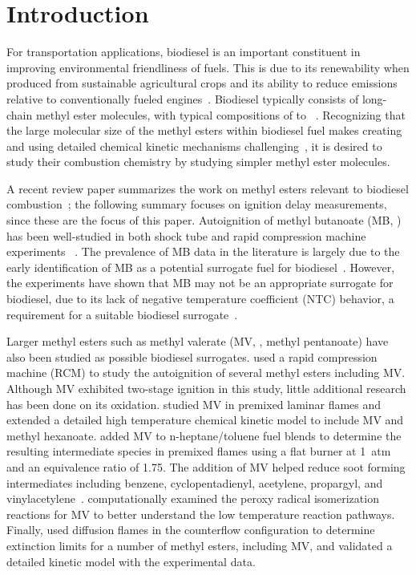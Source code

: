 \documentclass[letterpaper, review]{elsarticle}
\begin{document}
\linenumbers

\section{Introduction}\label{sec:introduction}

For transportation applications, biodiesel is an important constituent in improving environmental
friendliness of fuels. This is due to its renewability when produced from sustainable agricultural
crops and its ability to reduce emissions relative to conventionally fueled
engines~\cite{Hoekman2012}. Biodiesel typically consists of long-chain methyl ester molecules, with
typical compositions of  to ~\cite{Hoekman2012}. Recognizing that the large
molecular size of the methyl esters within biodiesel fuel makes creating and using detailed chemical
kinetic mechanisms challenging~\cite{Lai2011}, it is desired to study their combustion chemistry by
studying simpler methyl ester molecules.

A recent review paper summarizes the work on methyl esters relevant to biodiesel
combustion~\cite{Coniglio2013}; the following summary focuses on ignition delay measurements, since
these are the focus of this paper. Autoignition of methyl butanoate (MB, ) has been
well-studied in both shock tube and rapid compression machine experiments~
\cite{Metcalfe2007,Walton2009,Dooley2008,Akih-Kumgeh2010,Akih-Kumgeh2011,Hadj-Ali2009,Kumar2016}.
The prevalence of MB data in the literature is largely due to the early identification of MB as a
potential surrogate fuel for biodiesel~\cite{Fisher2000}. However, the experiments have shown that
MB may not be an appropriate surrogate for biodiesel, due to its lack of negative temperature
coefficient (NTC) behavior, a requirement for a suitable biodiesel surrogate~\cite{Coniglio2013}.

Larger methyl esters such as methyl valerate (MV, , methyl pentanoate) have also been
studied as possible biodiesel surrogates. \citet{Hadj-Ali2009} used a rapid compression machine
(RCM) to study the autoignition of several methyl esters including MV. Although MV exhibited
two-stage ignition in this study, little additional research has been done on its oxidation.
\citet{Korobeinichev2015} studied MV in premixed laminar flames and extended a detailed high
temperature chemical kinetic model to include MV and methyl hexanoate. \citet{Dmitriev2015} added
MV to n-heptane/toluene fuel blends to determine the resulting intermediate species in premixed
flames using a flat burner at \SI{1}{atm} and an equivalence ratio of 1.75. The addition of MV
helped reduce soot forming intermediates including benzene, cyclopentadienyl, acetylene, propargyl,
and vinylacetylene~\cite{Dmitriev2015}. \citet{Hayes2009} computationally examined the peroxy
radical isomerization reactions for MV to better understand the low temperature reaction pathways.
Finally, \citet{Dievart2013} used diffusion flames in the counterflow configuration to determine
extinction limits for a number of methyl esters, including MV, and validated a detailed kinetic
model with the experimental data.
\end{document}

